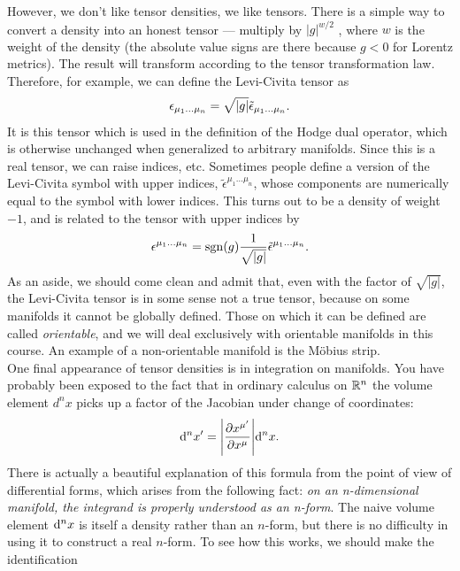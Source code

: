 However, we don’t like tensor densities, we like tensors. There is a simple way to convert
a density into an honest tensor — multiply by $|g|^{ w/2}$ , where $w$ is the weight of the density
(the absolute value signs are there because $g < 0$ for Lorentz metrics). The result will
transform according to the tensor transformation law. Therefore, for example, we can define
the Levi-Civita tensor as
\begin{equation}
	\epsilon_{\mu_1 \dots \mu_n} = \sqrt{\abs{g}} \tilde{\epsilon}_{\mu_1 \dots \mu_n}.
\end{equation}
It is this tensor which is used in the definition of the Hodge dual operator, which is otherwise
unchanged when generalized to arbitrary manifolds. Since this is a real tensor, we can raise
indices, etc. Sometimes people define a version of the Levi-Civita symbol with upper indices,
$\tilde{\epsilon}^{\mu_1 \dots \mu_n}$, whose components are numerically equal to the symbol with lower indices. This
turns out to be a density of weight $−1$, and is related to the tensor with upper indices by
\begin{equation}
	\epsilon^{\mu_1 \dots \mu_n} = \mathrm{sgn}(g) \frac{1}{\sqrt{\abs{g}}} \tilde{\epsilon}^{\mu_1 \dots \mu_n}.
	\end{equation}
As an aside, we should come clean and admit that, even with the factor of $\sqrt{|g|}$, the
Levi-Civita tensor is in some sense not a true tensor, because on some manifolds it cannot
be globally defined. Those on which it can be defined are called \emph{orientable}, and we will
deal exclusively with orientable manifolds in this course. An example of a non-orientable
manifold is the Möbius strip.\\
One final appearance of tensor densities is in integration on manifolds.
You have probably been exposed
to the fact that in ordinary calculus on $\mathbb{R}^n$ the volume element $d^n x$ picks up a factor of the
Jacobian under change of coordinates:
\begin{equation}
	\mathrm{d}^n x^\prime = \abs{\frac{\partial x^{\mu^\prime}}{\partial x^{\mu}}} \mathrm{d}^n x.
\end{equation}
There is actually a beautiful explanation of this formula from the point of view of differential
forms, which arises from the following fact: \emph{on an n-dimensional manifold, the integrand is
properly understood as an n-form}. The naive volume element $\mathrm{d}^n x$ is itself a density rather
than an $n$-form, but there is no difficulty in using it to construct a real $n$-form. To see how
this works, we should make the identification
